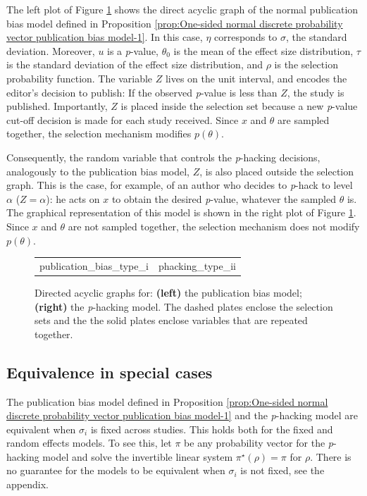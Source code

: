 \documentclass{article}
\theoremstyle{plain}
\theoremstyle{definition}
\begin{document}
The left plot of Figure \ref{fig:Plate notation, publication bias and p-hacking} shows the direct acyclic graph of the normal publication bias model defined in Proposition \ref{prop:One-sided normal discrete probability vector publication bias model-1}. In this case, $\eta$ corresponds to $\sigma$, the standard deviation. Moreover, $u$ is a \textit{p}-value, $\theta_{0}$ is the mean of the effect size distribution, $\tau$ is the standard deviation of the effect size distribution, and $\rho$ is the selection probability function. The variable $Z$ lives on the unit interval, and encodes the editor's decision to publish: If the observed \textit{p}-value is less than $Z$, the study is published. Importantly, $Z$ is placed inside the selection set because a new \textit{p}-value cut-off decision is made for each study received. Since $x$ and $\theta$ are sampled together, the selection mechanism modifies $p(\theta)$.%



Consequently, the random variable that controls the \textit{p}-hacking decisions, analogously to the publication bias model, $Z$, is also placed outside the selection graph. This is the case, for example, of an author who decides to \textit{p}-hack to level $\alpha$ ($Z = \alpha$): he acts on $x$ to obtain the desired \textit{p}-value, whatever the sampled $\theta$ is. The graphical representation of this model is shown in the right plot of Figure \ref{fig:Plate notation, publication bias and p-hacking}. Since $x$ and $\theta$ are not sampled together, the selection mechanism does not modify $p(\theta)$.

\begin{figure}
\begin{center}     
 \begin{tabular}{cc}    
  {publication_bias_type_i} &     
  {phacking_type_ii}
 \end{tabular} 
\end{center}
\caption{\label{fig:Plate notation, publication bias and p-hacking} Directed acyclic graphs for: {\bf (left)}
the publication bias model; {\bf (right)} the \textit{p}-hacking model. The dashed plates enclose the selection sets and the the solid plates enclose variables that are repeated together.}
\end{figure}

\subsection{Equivalence in special cases}
The publication bias model defined in Proposition \ref{prop:One-sided normal discrete probability vector publication bias model-1} and the \textit{p}-hacking model are equivalent when $\sigma_{i}$ is fixed across studies. This holds both for the fixed and random effects models. To see this, let $\pi$ be any probability vector for the \textit{p}-hacking model and solve the invertible linear system $\pi^{\star}(\rho)=\pi$ for $\rho$. There is no guarantee for the models to be equivalent when $\sigma_{i}$ is not fixed, see the appendix.
\end{document}
